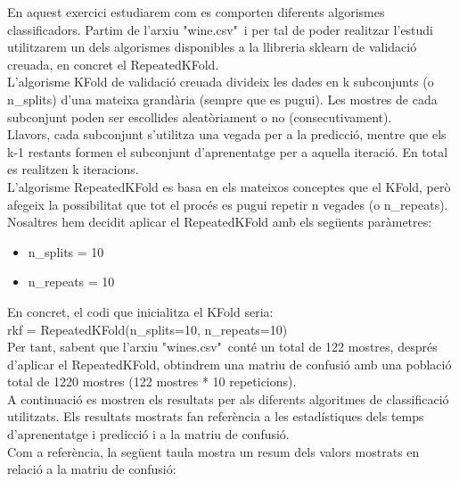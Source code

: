\documentclass{article} %
\begin{document}
{\color{blue}
	En aquest exercici estudiarem com es comporten diferents algorismes classificadors. Partim de l'arxiu "wine.csv"\ i per tal de poder realitzar l'estudi utilitzarem un dels algorismes disponibles a la llibreria sklearn de validació creuada, en concret el RepeatedKFold. \\

	L'algorisme KFold de validació creuada divideix les dades en k subconjunts (o n\_splits) d'una mateixa grandària (sempre que es pugui). Les mostres de cada subconjunt poden ser escollides aleatòriament o no (consecutivament). \\

	Llavors, cada subconjunt s'utilitza una vegada per a la predicció, mentre que els k-1 restants formen el subconjunt d'aprenentatge per a aquella iteració. En total es realitzen k iteracions. \\

	L'algorisme RepeatedKFold es basa en els mateixos conceptes que el KFold, però afegeix la possibilitat que tot el procés es pugui repetir n vegades (o n\_repeats). \\

	Nosaltres hem decidit aplicar el RepeatedKFold amb els següents paràmetres:
	{\selectfont\small
	\begin{itemize}
		\item n\_splits = 10
		\item n\_repeats = 10
	\end{itemize}
	}

	En concret, el codi que inicialitza el KFold seria: \\

	{\selectfont\small
		rkf = RepeatedKFold(n\_splits=10, n\_repeats=10)
	} \\

	Per tant, sabent que l'arxiu "wines.csv"\ conté un total de 122 mostres, després d'aplicar el RepeatedKFold, obtindrem una matriu de confusió amb una població total de 1220 mostres (122 mostres * 10 repeticions). \\

	A continuació es mostren els resultats per als diferents algoritmes de classificació utilitzats. Els resultats mostrats fan referència a les estadístiques dels temps d'aprenentatge i predicció i a la matriu de confusió. \\

	Com a referència, la següent taula mostra un resum dels valors mostrats en relació a la matriu de confusió:

}
\end{document}
